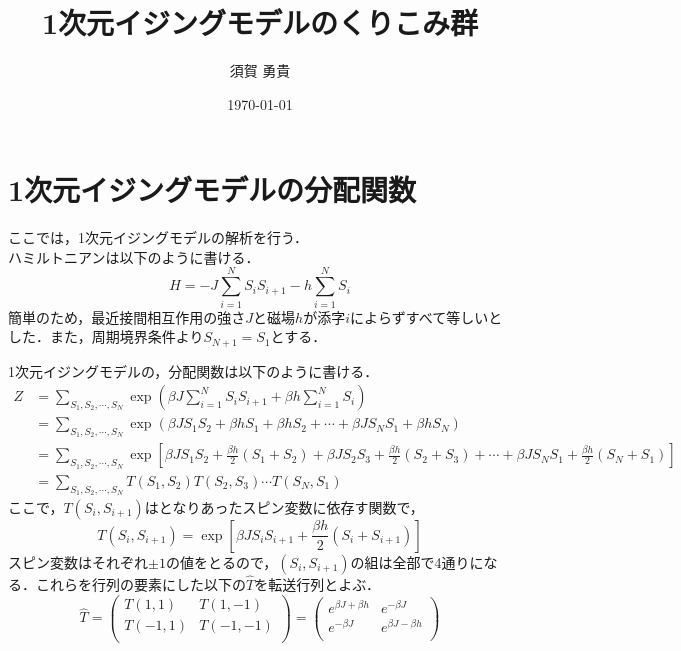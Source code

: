 \documentclass[a4paper,11pt]{jsarticle}
\begin{document}
\title{1次元イジングモデルのくりこみ群}
\author{須賀 勇貴}
\date{\today}
\maketitle

\section{1次元イジングモデルの分配関数}
ここでは，1次元イジングモデルの解析を行う．\\
ハミルトニアンは以下のように書ける．
\begin{equation*}
  H = -J \sum_{i=1}^{N} S_i S_{i+1} - h \sum_{i=1}^{N} S_i
\end{equation*}
簡単のため，最近接間相互作用の強さ$J$と磁場$h$が添字$i$によらずすべて等しいとした．また，周期境界条件より$S_{N+1}=S_1$とする．\par
1次元イジングモデルの，分配関数は以下のように書ける．
\begin{align*}
  Z 
  &= \sum_{S_1, S_2, \cdots, S_N}\exp \left(\beta J \sum_{i=1}^{N} S_i S_{i+1} +\beta h \sum_{i=1}^{N} S_i \right)\\
  &=  \sum_{S_1, S_2, \cdots, S_N}\exp \left( \beta J S_1 S_2 + \beta h S_1 + \beta h S_2 + \cdots + \beta J S_N S_1 + \beta h S_N \right)\\
  &=  \sum_{S_1, S_2, \cdots, S_N}\exp \left[ \beta J S_1 S_2 + \frac{\beta h}{2}(S_1 + S_2) + \beta J S_2 S_3 + \frac{\beta h}{2}(S_2 + S_3) + \cdots + \beta J S_N S_1 + \frac{\beta h}{2}(S_N + S_1) \right]\\
  &= \sum_{S_1, S_2, \cdots, S_N} T(S_1, S_2)T(S_2, S_3)\cdots T(S_N, S_1)
\end{align*}
ここで，$T(S_i, S_{i+1})$はとなりあったスピン変数に依存す関数で，
\begin{equation*}
  T(S_i, S_{i+1}) = \exp \left[ \beta J S_i S_{i+1} + \frac{\beta h}{2}(S_i + S_{i+1}) \right]
\end{equation*}
スピン変数はそれぞれ$\pm 1$の値をとるので，$(S_i, S_{i+1})$の組は全部で4通りになる．これらを行列の要素にした以下の$\hat{T}$を転送行列とよぶ．
\begin{equation*}
  \hat{T} = 
  \begin{pmatrix}
    T(1,1) & T(1,-1) \\
    T(-1,1) & T(-1,-1) \\
  \end{pmatrix}
  =
  \begin{pmatrix}
    e^{\beta J + \beta h} & e^{-\beta J} \\
    e^{-\beta J} & e^{\beta J - \beta h} \\
  \end{pmatrix}
\end{equation*}
\end{document}
